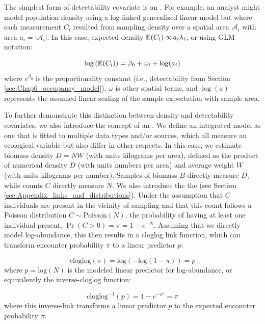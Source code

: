 The simplest form of detectability covariate is an .  For example, an analyst might model population density using a log-linked generalized linear model but where each measurement \(C_i\) resulted from sampling density over a spatial area \(\mathcal{A}_i\) with area \( a_i = |\mathcal{A}_i|\).  In this case, expected density \( \operatorname{\mathbb{E}}(C_i) \propto a_i \lambda_i \), or using GLM notation:

\begin{equation}
    \log \left(\operatorname{\mathbb{E}}(C_i) \right) = \beta_0 + \omega_i + \log(a_i)
\end{equation}
where \(e^{\beta_0}\) is the proportionality constant (i.e., detectability from Section \ref{sec:Chap6_occupancy_model}), \(\omega\) is other spatial terms, and \(\log(a)\) represents the assumed linear scaling of the sample expectation with sample area.  

To further demonstrate this distinction between density and detectability covariates, we also introduce the concept of an .  We define an integrated model as one that is fitted to multiple data types and/or sources, which all measure an ecological variable but also differ in other respects.  In this case, we estimate biomass density \(D = N W\) (with units kilograms per area), defined as the product of numerical density \(D\) (with units numbers per area) and average weight \(W\) (with units kilograms per number).  Samples of biomass \(B\) directly measure \(D\), while counts \(C\) directly measure \(N\).  We also introduce the the  (see Section \ref{sec:Appendix_links_and_distributions}).  Under the assumption that \(C\) individuals are present in the vicinity of sampling and that this count follows a Poisson distribution \(C \sim \mathrm{Poisson}(N)\), the probability of having at least one individual present, \( \Pr(C>0) = \pi = 1 - e^{-N} \).  Assuming that we directly model log-abundance, this then results in a cloglog link function, which can transform encounter probability \(\pi\) to a linear predictor \(p\):

\begin{equation} \label{eq:Chap7_cloglog}
  \mathrm{cloglog}(\pi) = \mathrm{log}( - \mathrm{log}(1 - \pi)) = p
\end{equation}
where \(p = \mathrm{log}(N)\) is the modeled linear predictor for log-abundance, or equivalently the inverse-cloglog function:

\begin{equation} \label{eq:Chap7_clogloginv}
  \mathrm{cloglog}^{-1}(p) = 1 - e^{-e^p} = \pi
\end{equation}
where this inverse-link transforms a linear predictor \(p\) to the expected encounter probability \(\pi\).
 

